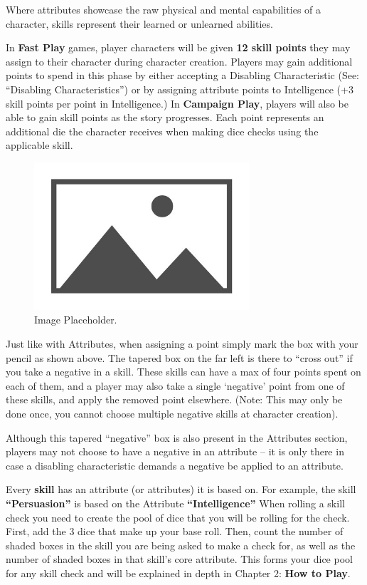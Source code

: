 Where attributes showcase the raw physical and mental capabilities of a character, skills represent their learned or unlearned abilities.

In \textbf{Fast Play} games, player characters will be given \textbf{12 skill points} they may assign to their character during character creation. Players may gain additional points to spend in this phase by either accepting a Disabling Characteristic (See: “Disabling Characteristics”) or by assigning attribute points to Intelligence (+3 skill points per point in Intelligence.) In \textbf{Campaign Play}, players will also be able to gain skill points as the story progresses. Each point represents an additional die the character receives when making dice checks using the applicable skill.

\begin{figure}[H]
    \includegraphics[width=8cm]{images/placeholder}
    \centering
    \caption{Image Placeholder.}
\end{figure}

Just like with Attributes, when assigning a point simply mark the box with your pencil as shown above. The tapered box on the far left is there to “cross out” if you take a negative in a skill. These skills can have a max of four points spent on each of them, and a player may also take a single ‘negative’ point from one of these skills, and apply the removed point elsewhere. (Note: This may only be done once, you cannot choose multiple negative skills at character creation).

Although this tapered “negative” box is also present in the Attributes section, players may not choose to have a negative in an attribute – it is only there in case a disabling characteristic demands a negative be applied to an attribute.

Every \textbf{skill} has an attribute (or attributes) it is based on. For example, the skill \textbf{“Persuasion”} is based on the Attribute \textbf{“Intelligence”} When rolling a skill check you need to create the pool of dice that you will be rolling for the check. First, add the 3 dice that make up your base roll. Then, count the number of shaded boxes in the skill you are being asked to make a check for, as well as the number of shaded boxes in that skill’s core attribute. This forms your dice pool for any skill check and will be explained in depth in Chapter 2: \textbf{How to Play}.

